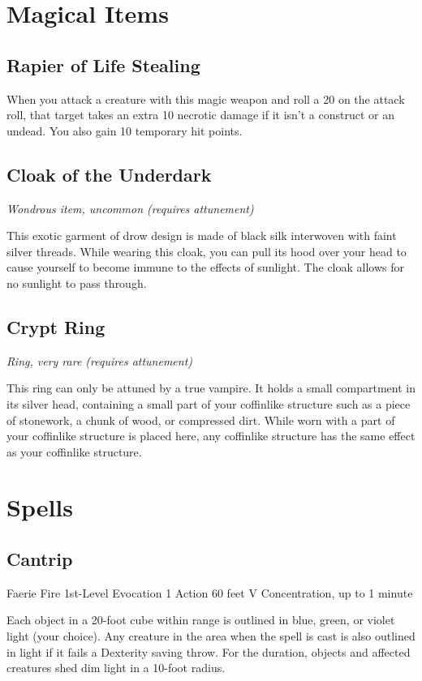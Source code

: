 \documentclass[letterpaper,openany,oneside,twocolumn]{book}
\begin{document}
\section*{Magical Items}
\subsection*{Rapier of Life Stealing}
When you attack a creature with this magic weapon and roll a 20 on the attack roll, that target takes an extra 10 necrotic damage if it isn't a construct or an undead. You also gain 10 temporary hit points.
\subsection*{Cloak of the Underdark}
\textit{Wondrous item, uncommon (requires attunement)}

This exotic garment of drow design is made of black silk interwoven with faint silver threads. While wearing this cloak, you can pull its hood over your head to cause yourself to become immune to the effects of sunlight. The cloak allows for no sunlight to pass through.
\subsection*{Crypt Ring}
\textit{Ring, very rare (requires attunement)}

This ring can only be attuned by a true vampire. It holds a small compartment in its silver head, containing a small part of your coffinlike structure such as a piece of stonework, a chunk of wood, or compressed dirt. While worn with a part of your coffinlike structure is placed here, any coffinlike structure has the same effect as your coffinlike structure.

\section*{Spells}
\subsection*{Cantrip}

\DndSpellHeader
  {Faerie Fire}
  {1st-Level Evocation}
  {1 Action}
  {60 feet}
  {V}
  {Concentration, up to 1 minute}

Each object in a 20-foot cube within range is outlined in blue, green, or violet light (your choice). Any creature in the area when the spell is cast is also outlined in light if it fails a Dexterity saving throw. For the duration, objects and affected creatures shed dim light in a 10-foot radius.
\end{document}
